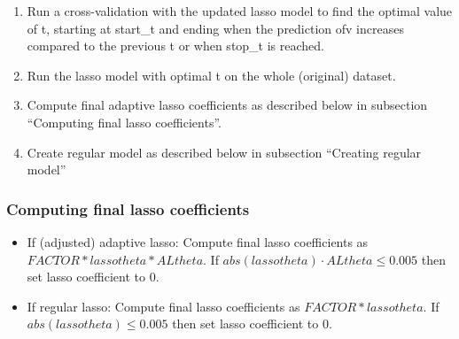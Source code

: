 \begin{enumerate}
\begin{enumerate}
\item Run a cross-validation with the updated lasso model to find the optimal value of t, 
starting at start\_t and ending when the prediction ofv increases compared to the
previous t or when stop\_t is reached.
\item Run the lasso model with optimal t on the whole (original) dataset. 
\item Compute final adaptive lasso coefficients as described below in subsection
``Computing final lasso coefficients''.
\item Create regular model as described below in subsection ``Creating regular model''
\end{enumerate}
\end{enumerate}

\subsubsection*{Computing final lasso coefficients}
\begin{itemize}
\item If (adjusted) adaptive lasso: Compute final lasso coefficients as
$FACTOR*lassotheta*ALtheta$. If $abs(lassotheta)\cdot ALtheta\leq 0.005$ then set lasso coefficient to 0.
\item If regular lasso:
Compute final lasso coefficients as $FACTOR*lassotheta$. If $abs(lassotheta)\leq 0.005$ then
set lasso coefficient to 0.
\end{itemize}

